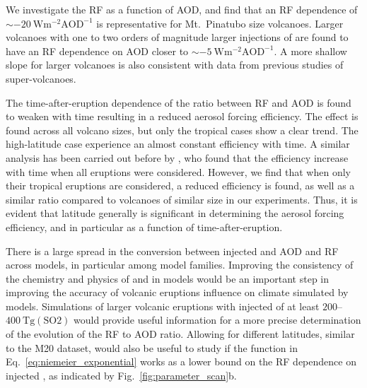 \documentclass[draft]{agujournal2019}
\newcommand{\iso}[1][i]{{#1}njected \ce{SO2}}
\begin{document}
We investigate the RF as a function of AOD, and find that an RF
dependence of \(\sim\SI{-20}{\watt\metre^{-2}\mathrm{AOD}^{-1}}\) is representative for
Mt.\ Pinatubo size volcanoes. Larger volcanoes with one to two orders of magnitude
larger injections of  are found to have an RF dependence on AOD
closer to \(\sim \SI{-5}{\watt\metre^{-2}\mathrm{AOD}^{-1}}\). A more shallow slope for
larger volcanoes is also consistent with data from previous studies of super-volcanoes.

The time-after-eruption dependence of the ratio between RF and AOD is found
to weaken with time resulting in a reduced aerosol forcing efficiency. The effect is
found across all volcano sizes, but only the tropical cases show a clear trend. The
high-latitude case experience an almost constant efficiency with time. A similar
analysis has been carried out before by , who found that the
efficiency increase with time when all eruptions were considered. However, we find that
when only their tropical eruptions are considered, a reduced efficiency is found, as
well as a similar ratio compared to volcanoes of similar size in our experiments. Thus,
it is evident that latitude generally is significant in determining the aerosol forcing
efficiency, and in particular as a function of time-after-eruption.

There is a large spread in the conversion between \iso{} and AOD and RF
across models, in particular among model families. Improving the consistency of the
chemistry and physics of  and  in models would be an important step in
improving the accuracy of volcanic eruptions influence on climate simulated by models.
Simulations of larger volcanic eruptions with \iso{} of at least
\(200\)--\(\SI{400}{\tera\gram(\mathrm{SO2})}\) would provide useful information for a
more precise determination of the evolution of the RF to AOD ratio. Allowing
for different latitudes, similar to the M20 dataset, would also be useful to study
if the function in Eq.~\ref{eq:niemeier_exponential} works as a lower bound on the
RF dependence on \iso{}, as indicated by Fig.~\ref{fig:parameter_scan}b.


%
%
%
%
\appendix
\end{document}
